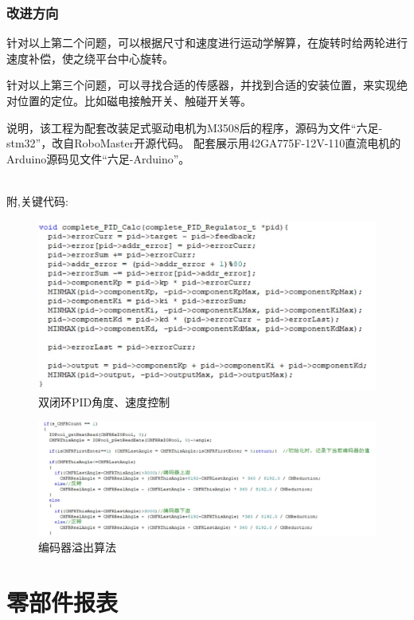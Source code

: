 \documentclass[12pt]{article}
\begin{document}
\begin{CJK}{UTF8}{gbsn}
\subsubsection{改进方向}
针对以上第二个问题，可以根据尺寸和速度进行运动学解算，在旋转时给两轮进行速度补偿，使之绕平台中心旋转。\par
针对以上第三个问题，可以寻找合适的传感器，并找到合适的安装位置，来实现绝对位置的定位。比如磁电接触开关、触碰开关等。\par
说明，该工程为配套改装足式驱动电机为M3508后的程序，源码为文件“六足-stm32”，改自RoboMaster开源代码。 配套展示用42GA775F-12V-110直流电机的Arduino源码见文件“六足-Arduino”。\par
~\\
附,关键代码:
 \begin{figure}[H]
\centering
\includegraphics[width=.9\textwidth]{chap5//fig7.jpg}
\caption{双闭环PID角度、速度控制}
\end{figure}
 \begin{figure}[H]
\centering
\includegraphics[width=.9\textwidth]{chap5//fig8.jpg}
\caption{编码器溢出算法}
\end{figure}

\section{零部件报表}

\end{CJK}
\end{document}
